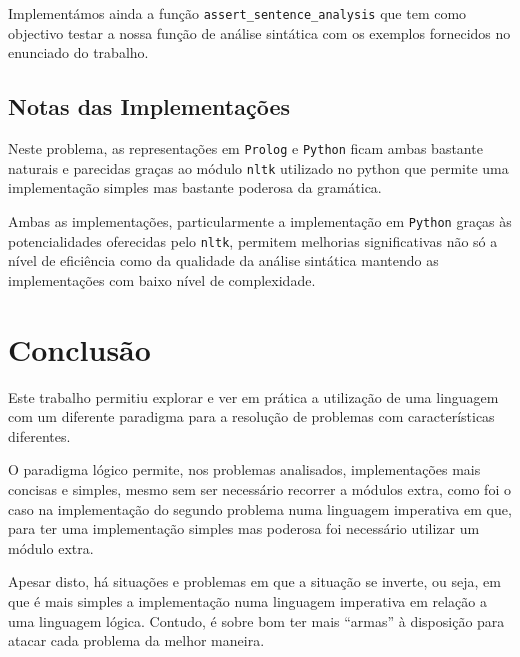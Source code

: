 \documentclass[12pt,a4paper,oneside]{article}
\begin{document}
Implementámos ainda a função \texttt{assert\_sentence\_analysis} que tem como objectivo
testar a nossa função de análise sintática com os exemplos fornecidos no enunciado do
trabalho.

\subsection{Notas das Implementações}

Neste problema, as representações em \texttt{Prolog} e \texttt{Python} ficam ambas bastante
naturais e parecidas graças ao módulo \texttt{nltk} utilizado no python que permite uma
implementação simples mas bastante poderosa da gramática.

Ambas as implementações, particularmente a implementação em \texttt{Python} graças às
potencialidades oferecidas pelo \texttt{nltk}, permitem melhorias significativas não só a
nível de eficiência como da qualidade da análise sintática mantendo as implementações com
baixo nível de complexidade.



\section{Conclusão}
\label{sec:conc}

Este trabalho permitiu explorar e ver em prática a utilização de uma linguagem com um
diferente paradigma para a resolução de problemas com características diferentes.

O paradigma lógico permite, nos problemas analisados, implementações mais concisas e
simples, mesmo sem ser necessário recorrer a módulos extra, como foi o caso na implementação
do segundo problema numa linguagem imperativa em que, para ter uma implementação simples
mas poderosa foi necessário utilizar um módulo extra.

Apesar disto, há situações e problemas em que a situação se inverte, ou seja, em que é mais
simples a implementação numa linguagem imperativa em relação a uma linguagem lógica. Contudo,
é sobre bom ter mais ``armas'' à disposição para atacar cada problema da melhor maneira.




\end{document}
